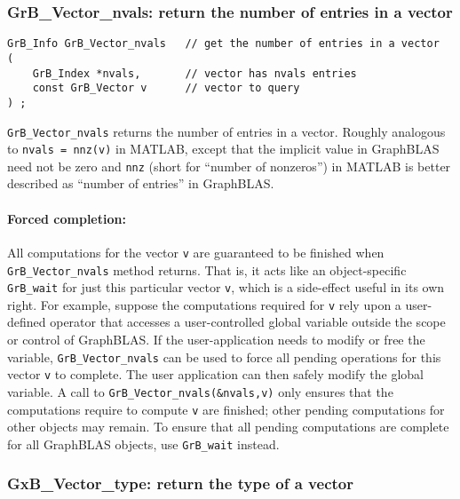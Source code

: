 \documentclass[12pt]{article}
\begin{document}
\subsubsection{{\sf GrB\_Vector\_nvals:}         return the number of entries in a vector}
\label{vector_nvals}

\begin{mdframed}[userdefinedwidth=6in]
{\footnotesize
\begin{verbatim}
GrB_Info GrB_Vector_nvals   // get the number of entries in a vector
(
    GrB_Index *nvals,       // vector has nvals entries
    const GrB_Vector v      // vector to query
) ;
\end{verbatim}
} \end{mdframed}

\verb'GrB_Vector_nvals' returns the number of entries in a vector.  Roughly
analogous to \verb'nvals = nnz(v)' in MATLAB, except that the implicit value in
GraphBLAS need not be zero and \verb'nnz' (short for ``number of nonzeros'') in
MATLAB is better described as ``number of entries'' in GraphBLAS.

\paragraph{Forced completion:}
All computations for the vector \verb'v' are guaranteed to be finished when
\verb'GrB_Vector_nvals' method returns.
%
That is, it acts like an object-specific \verb'GrB_wait' for just this
particular vector \verb'v', which is a side-effect useful in its own right.
For example, suppose the computations required for \verb'v' rely upon a
user-defined operator that accesses a user-controlled global variable outside
the scope or control of GraphBLAS.  If the user-application needs to modify or
free the variable, \verb'GrB_Vector_nvals' can be used to force all pending
operations for this vector \verb'v' to complete.  The user application can then
safely modify the global variable.  A call to \verb'GrB_Vector_nvals(&nvals,v)'
only ensures that the computations require to compute \verb'v' are finished;
other pending computations for other objects may remain.  To ensure that all
pending computations are complete for all GraphBLAS objects, use
\verb'GrB_wait' instead.

\subsubsection{{\sf GxB\_Vector\_type:}          return the type of a vector}
\label{vector_type}
\end{document}
